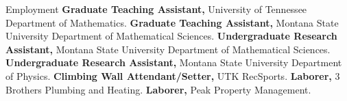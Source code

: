 \begin{rubric}{Employment}
\entry*[2022--$\cdots$] \textbf{Graduate Teaching Assistant,} University of Tennessee Department of Mathematics.
\entry*[2020--2022] \textbf{Graduate Teaching Assistant,} Montana State University Department of Mathematical Sciences.
\entry*[2019--2020] \textbf{Undergraduate Research Assistant,} Montana State University Department of Mathematical Sciences.
\entry*[2018--2019] \textbf{Undergraduate Research Assistant,} Montana State University Department of Physics.
\entry*[2023--2024] \textbf{Climbing Wall Attendant/Setter,} UTK RecSports.
\entry*[2015--2022] \textbf{Laborer,} 3 Brothers Plumbing and Heating.
\entry*[2020] \textbf{Laborer,} Peak Property Management.
\end{rubric}

